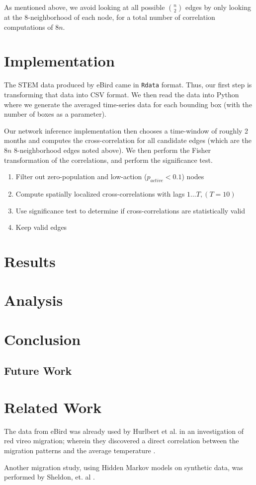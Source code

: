 \documentclass{article} %
\begin{document}
As mentioned above, we avoid looking at all possible $n \choose 2$ edges by only looking at the 8-neighborhood of each node, for a total number of correlation computations of $8n$.

\section{Implementation}
The STEM data produced by eBird came in \texttt{Rdata} format. Thus, our first step is transforming that data into CSV format. We then read the data into Python where we generate the averaged time-series data for each bounding box (with the number of boxes as a parameter). 

Our network inference implementation then chooses a time-window of roughly 2 months and computes the cross-correlation for all candidate edges (which are the $8n$ 8-neighborhood edges noted above). We then perform the Fisher transformation of the correlations, and perform the significance test. 

\begin{enumerate}
\item Filter out zero-population and low-action ($p_{active} < 0.1$) nodes
\item Compute spatially localized cross-correlations with lags $1\dots T, (T=10)$
\item Use significance test to determine if cross-correlations are statistically valid
\item Keep valid edges
\end{enumerate}

\section{Results}

\section{Analysis}

\section{Conclusion}

\subsection{Future Work}


\section{Related Work}
The data from eBird was already used by Hurlbert et al. in an investigation of red vireo migration; wherein they discovered a direct correlation between the migration patterns and the average temperature \cite{hurlbert}. 

Another migration study, using Hidden Markov models on synthetic data, was performed by Sheldon, et. al \cite{conf/nips/SheldonEK07}. 



\end{document}

